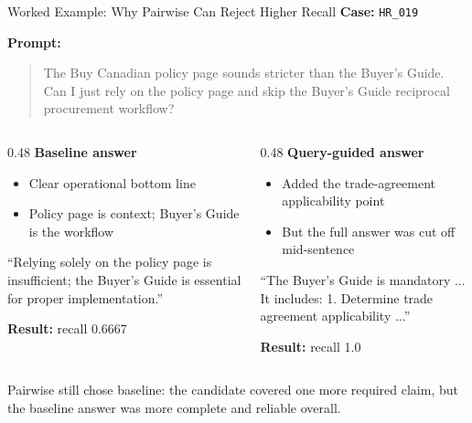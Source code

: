 \documentclass[aspectratio=169]{beamer}
\begin{document}
\begin{frame}{Worked Example: Why Pairwise Can Reject Higher Recall}
  \small
  \textbf{Case:} \texttt{HR\_019}

  \vspace{0.4em}
  \textbf{Prompt:}
  \begin{quote}
    The Buy Canadian policy page sounds stricter than the Buyer’s Guide. Can I
    just rely on the policy page and skip the Buyer’s Guide reciprocal
    procurement workflow?
  \end{quote}

  \begin{columns}[T]
    \begin{column}{0.48\textwidth}
      \textbf{Baseline answer}
      \begin{itemize}
        \item Clear operational bottom line
        \item Policy page is context; Buyer’s Guide is the workflow
      \end{itemize}
      \scriptsize
      ``Relying solely on the policy page is insufficient; the Buyer's Guide is
      essential for proper implementation.''
      \normalsize

      \vspace{0.3em}
      \textbf{Result:} recall 0.6667
    \end{column}
    \begin{column}{0.48\textwidth}
      \textbf{Query-guided answer}
      \begin{itemize}
        \item Added the trade-agreement applicability point
        \item But the full answer was cut off mid-sentence
      \end{itemize}
      \scriptsize
      ``The Buyer's Guide is mandatory ... It includes: 1. Determine trade
      agreement applicability ...''
      \normalsize

      \vspace{0.3em}
      \textbf{Result:} recall 1.0
    \end{column}
  \end{columns}

  \vspace{0.5em}
  Pairwise still chose baseline: the candidate covered one more required claim,
  but the baseline answer was more complete and reliable overall.
\end{frame}
\end{document}
